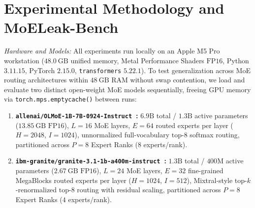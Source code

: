 \documentclass[11pt,a4paper]{article}
\renewcommand{\_}{\textunderscore\allowbreak}
\theoremstyle{definition}
\theoremstyle{remark}
\begin{document}
\section{Experimental Methodology and MoELeak-Bench}\label{sec:methodology}

\emph{Hardware and Models:} All experiments run locally on an Apple M5 Pro workstation ($48.0~\mathrm{GB}$ unified memory, Metal Performance Shaders $\mathrm{FP16}$, Python $3.11.15$, PyTorch $2.15.0$, \texttt{transformers} $5.22.1$). To test generalization across MoE routing architectures within $48~\mathrm{GB}$ RAM without swap contention, we load and evaluate two distinct open-weight MoE models sequentially, freeing GPU memory via \texttt{torch.mps.empty\_cache()} between runs:
\begin{enumerate}
  \item \textbf{\texttt{allenai/OLMoE-1B-7B-0924-Instruct}~\cite{muennighoff2025olmoe}:} $6.9\mathrm{B}$ total / $1.3\mathrm{B}$ active parameters ($13.85~\mathrm{GB}$ $\mathrm{FP16}$), $L=16$ MoE layers, $E=64$ routed experts per layer ($H=2048$, $I=1024$), unnormalized full-vocabulary $\text{top-}8$ softmax routing, partitioned across $P=8$ Expert Ranks ($8$ experts/rank).
  \item \textbf{\texttt{ibm-granite/}\allowbreak\texttt{granite-3.1-}\allowbreak\texttt{1b-a400m-instruct}~\cite{gale2023megablocks}:} $1.3\mathrm{B}$ total / $400\mathrm{M}$ active parameters ($2.67~\mathrm{GB}$ $\mathrm{FP16}$), $L=24$ MoE layers, $E=32$ fine-grained MegaBlocks routed experts per layer ($H=1024$, $I=512$), Mixtral-style top-$k$-renormalized $\text{top-}8$ routing with residual scaling, partitioned across $P=8$ Expert Ranks ($4$ experts/rank).
\end{enumerate}
\end{document}
